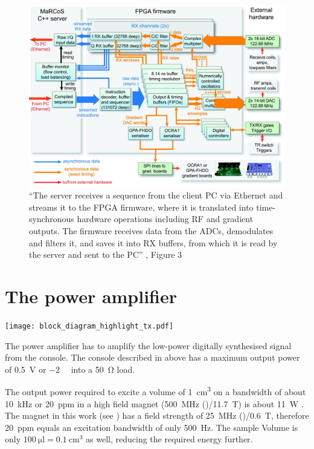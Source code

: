 \begin{figure}[hbt]
    \centering
    \includegraphics{images/marcos.jpg}
    \caption{ \enquote{The server receives a sequence from the client PC via Ethernet and streams it to the FPGA firmware, where it is translated into time-synchronous hardware operations including RF and gradient outputs. The firmware receives data from the ADCs, demodulates and filters it, and saves it into RX buffers, from which it is read by the server and sent to the PC} \cite{negnevitskyMaRCoSOpensourceElectronic2023}, Figure 3}
\end{figure}

\section{The power amplifier}
\begin{marginfigure}[-4.5\baselineskip]
    \texttt{[image: block\_diagram\_highlight\_tx.pdf]}
\end{marginfigure}

The power amplifier has to amplify the low-power digitally synthesised signal from the console. The console described in  above has a maximum output power of \qty{0.5}{\volt} or \qty{-2}{\deci\belm} into a \qty{50}{\ohm} load.

The output power required to excite a volume of \qty{1}{\centi\meter\cubed} on a bandwidth of about \qty{10}{\kilo\hertz} or \qty{20}{ppm} in a high field magnet (\qty{500}{\mega\hertz} ()/\qty{11.7}{\tesla}) is about \qty{11}{\watt} . The magnet in this work (see ) has a field strength of \qty{25}{\mega\hertz} ()/\qty{0.6}{\tesla}, therefore \qty{20}{ppm} equals an excitation bandwidth of only \qty{500}{\hertz}. The sample Volume is only \(\qty{100}{\micro\litre} = \qty{0.1}{\centi\meter\cubed}\) as well, reducing the required energy further.

